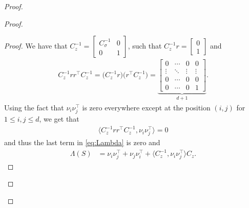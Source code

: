 \documentclass[11pt]{article}
\begin{document}
\begin{proof}
\begin{proof}
\begin{proof}
We have that
$C_z^{-1}
 = 
\begin{bmatrix} 
C_\sigma^{-1} & 0 \\
0 & 1
\end{bmatrix}$, such that $C_z^{-1}  r = \begin{bmatrix}
0\\
1
\end{bmatrix}$ and
\begin{align*}
C_z^{-1}  r  r^\top  C_z^{-1}
 = 
\bigl(C_z^{-1}r\bigr)  \bigl(r^\top C_z^{-1}\bigr)
 = 
\underbrace{
\begin{bmatrix}
0 & \cdots & 0 & 0\\
\vdots & \ddots & \vdots & \vdots\\
0 & \cdots & 0 & 0\\
0 & \cdots & 0 & 1
\end{bmatrix}
}_{d+1}.
\end{align*}
Using the fact that $\nu_i \nu_j^\top$ is zero everywhere except at the position $(i,j)$ for $1 \leq i,j \leq d$, we get that
\begin{align*}
   \langle  C_z^{-1}  r  r^\top  C_z^{-1}, \nu_i \nu_j^\top \rangle = 0
\end{align*}
and thus the last term in \eqref{eq:Lambda} is zero and 
\begin{align*}
	\Lambda(S) &= \nu_i \nu_j^\top + \nu_j \nu_i^\top + \langle C_z^{-1}, \nu_i \nu_j^\top \rangle C_z . %
\end{align*}

\end{proof}
\end{proof}
\end{proof}
\end{document}
